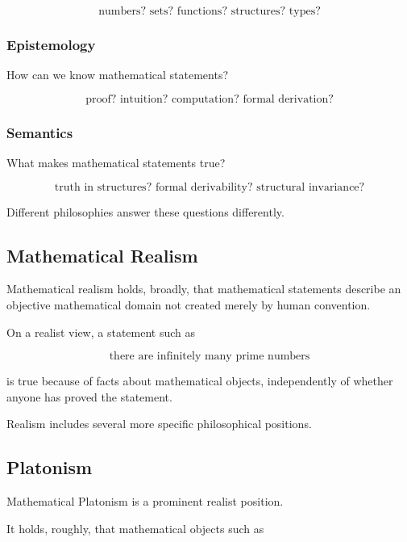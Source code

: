\[
\boxed{
\text{numbers? sets? functions? structures? types?}
}
\]

\subsubsection{Epistemology}

How can we know mathematical statements?

\[
\boxed{
\text{proof? intuition? computation? formal derivation?}
}
\]

\subsubsection{Semantics}

What makes mathematical statements true?

\[
\boxed{
\text{truth in structures? formal derivability? structural invariance?}
}
\]

Different philosophies answer these questions differently.

\subsection{Mathematical Realism}
\label{subsec:mathematical-realism}

Mathematical realism holds, broadly, that mathematical statements describe
an objective mathematical domain not created merely by human convention.

On a realist view, a statement such as

\[
\boxed{
\text{there are infinitely many prime numbers}
}
\]

is true because of facts about mathematical objects, independently of
whether anyone has proved the statement.

Realism includes several more specific philosophical positions.

\subsection{Platonism}
\label{subsec:mathematical-platonism}

Mathematical Platonism is a prominent realist position.

It holds, roughly, that mathematical objects such as

